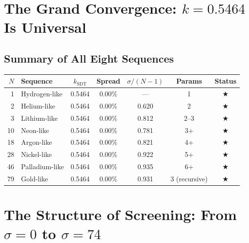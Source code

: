 \section{The Grand Convergence: $k = 0.5464$ Is Universal}

\subsection{Summary of All Eight Sequences}

\begin{center}
\begin{tabular}{rlccccc}
\hline
$N$ & \textbf{Sequence} & $k_{\text{SDT}}$ & \textbf{Spread} & $\sigma/(N{-}1)$ & \textbf{Params} & \textbf{Status} \\
\hline
 1 & Hydrogen-like & 0.5464 & 0.00\% & --- & 1 & $\bigstar$ \\
 2 & Helium-like   & 0.5464 & 0.00\% & 0.620 & 2 & $\bigstar$ \\
 3 & Lithium-like  & 0.5464 & 0.00\% & 0.812 & 2--3 & $\bigstar$ \\
10 & Neon-like     & 0.5464 & 0.00\% & 0.781 & 3+ & $\bigstar$ \\
18 & Argon-like    & 0.5464 & 0.00\% & 0.821 & 4+ & $\bigstar$ \\
28 & Nickel-like   & 0.5464 & 0.00\% & 0.922 & 5+ & $\bigstar$ \\
46 & Palladium-like& 0.5464 & 0.00\% & 0.935 & 6+ & $\bigstar$ \\
79 & Gold-like     & 0.5464 & 0.00\% & 0.931 & 3 (recursive) & $\bigstar$ \\
\hline
\end{tabular}
\end{center}

\noindent{}


\section{The Structure of Screening: From $\sigma = 0$ to $\sigma = 74$}

